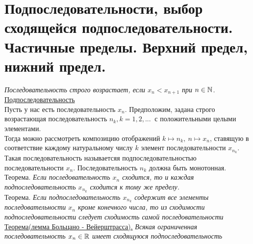 \section{Подпоследовательности, выбор сходящейся подпоследовательности. Частичные пределы. Верхний предел,
нижний предел.}

\textit{Последовательность строго возрастает, если $x_n < x_{n+1}$ при $n \in \mathbb{N}$.}\\
\underline{Подпоследовательность}\\
Пусть у нас есть последовательность $x_n$. Предположим, задана строго возрастающая последовательность $n_k, k = 1,2,... \:$ с положительными целыми элементами. \\
Тогда можно рассмотреть композицию отображений $k \mapsto n_k, \: n \mapsto x_n$, ставящую в соответствие каждому натуральному числу $k$ элемент последовательности $x_{n_k}$.\\
Такая последовательность называетсяя подпоследовательностью последовательности $x_n$.
Последовательность $n_k$ должна быть монотонная.\\
Теорема. \textit{Если последовательность $x_n$ сходится, то и каждая подпоследовательность $x_{n_k}$ сходится к тому же пределу.}\\
Теорема. \textit{Если подпоследовательность $x_{n_k}$ содержит все элементы последовательности $x_n$ кроме конечного числа, то из сходимости подпоследовательности следует сходимость самой последовательности}\\
\underline{Теорема(лемма Больцано - Вейерштрасса).}
\textit{Всякая ограниченная последовательность $x_n \in \mathbb{R}$ имеет сходящуюся подпоследовательность}\\

